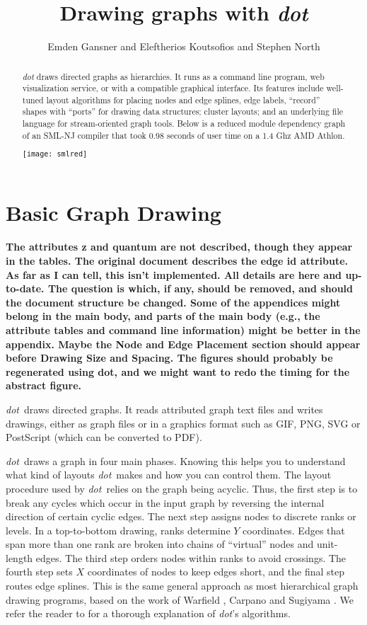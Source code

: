 \documentclass[11pt]{article}
\author{Emden Gansner and Eleftherios Koutsofios and Stephen North}
\date{\lastedited}
\def\dot{{\it dot}}
\begin{document}

\title{Drawing graphs with \dot}
\maketitle
\begin{abstract}
\noindent
{\dot} draws directed graphs as hierarchies.
It runs as a command line program, web visualization
service, or with a compatible graphical interface.
Its features include well-tuned layout algorithms
for placing nodes and edge splines, edge labels,
``record'' shapes with ``ports'' for drawing data structures;
cluster layouts; and an underlying file language for
stream-oriented graph tools.
Below is a reduced module dependency graph of an SML-NJ compiler
that took 0.98 seconds of user time on a 1.4 Ghz AMD Athlon.

\vspace*{.25in}
\centerline{
	\texttt{[image: smlred]}
}
\end{abstract}

\newpage
\section{Basic Graph Drawing}

{\bf The attributes z and quantum are not described, though they
appear in the tables. The original document describes the edge id
attribute. As far as I can tell, this isn't implemented.
All details are here and up-to-date.
The question is which, if any, should be removed,
and should the document structure be changed. Some of the
appendices might belong in the main body, and parts of the main
body (e.g., the attribute tables and command line information) 
might be better in the appendix. Maybe the Node and Edge Placement
section should appear before Drawing Size and Spacing.
The figures should probably be regenerated using dot, and we might
want to redo the timing for the abstract figure.}
\fi

\dot\ draws directed graphs.  It reads attributed graph text files and
writes drawings, either as graph files or in a graphics format
such as GIF, PNG, SVG or PostScript (which can be converted to PDF).

\dot\ draws a graph in four main phases.
Knowing this helps you to understand what kind of
layouts \dot\ makes and how you can control them.
The layout procedure used by \dot\ relies on the graph
being acyclic. Thus, the first step is to break any
cycles which occur in the input graph by reversing
the internal direction of certain cyclic edges.
The next step assigns nodes to discrete ranks or levels.
In a top-to-bottom drawing, ranks determine $Y$ coordinates.
Edges that span more than one rank are broken into chains
of ``virtual'' nodes and unit-length edges.
The third step orders nodes within ranks to avoid crossings.
The fourth step sets $X$ coordinates of nodes to keep edges short,
and the final step routes edge splines.
This is the same general approach as most hierarchical graph drawing
programs, based on the work of Warfield \cite{warfield},
Carpano \cite{carpano} and Sugiyama \cite{stt}.
We refer the reader to \cite{gknv:methods}
for a thorough explanation of \dot's algorithms.
\end{document}
